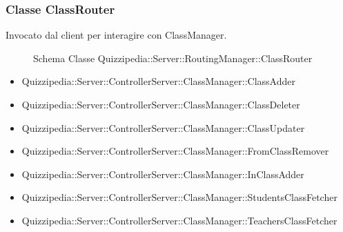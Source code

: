 \subsubsection{Classe ClassRouter}
Invocato dal client per interagire con ClassManager.
\begin{figure}[H]
\centering
\noindent{}
\caption{Schema Classe Quizzipedia::Server::RoutingManager::ClassRouter}
\end{figure}
\begin{itemize}
\item Quizzipedia::Server::ControllerServer::ClassManager::ClassAdder
\item Quizzipedia::Server::ControllerServer::ClassManager::ClassDeleter
\item Quizzipedia::Server::ControllerServer::ClassManager::ClassUpdater
\item Quizzipedia::Server::ControllerServer::ClassManager::FromClassRemover
\item Quizzipedia::Server::ControllerServer::ClassManager::InClassAdder
\item Quizzipedia::Server::ControllerServer::ClassManager::StudentsClassFetcher
\item Quizzipedia::Server::ControllerServer::ClassManager::TeachersClassFetcher
\end{itemize}
